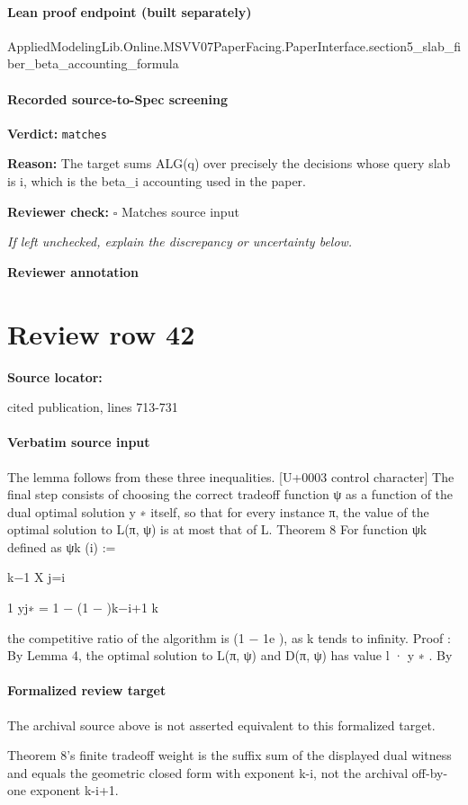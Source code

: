 \documentclass[10pt]{article}
\newcommand{\reviewerbox}{%
  \par\noindent\fbox{\parbox{0.96\linewidth}{\rule{0pt}{0.38in}}}\par
}
\newcommand{\reviewmatch}[1]{%
  \par\noindent\textbf{Reviewer check:} $\square$\; #1\par
  \noindent\emph{If left unchecked, explain the discrepancy or uncertainty below.}\par
}
\begin{document}
\paragraph{Lean proof endpoint (built separately)}\begin{ReviewVerbatim}
AppliedModelingLib.Online.MSVV07PaperFacing.PaperInterface.section5_slab_fiber_beta_accounting_formula
\end{ReviewVerbatim}

\paragraph{Recorded source-to-Spec screening}
\textbf{Verdict:} \texttt{matches}
\\
{\raggedright
\textbf{Reason:} The target sums ALG(q) over precisely the decisions whose query slab is i, which is the beta\_\allowbreak{}i accounting used in the paper.\allowbreak{}
\par}
\reviewmatch{Matches source input}
\noindent\textbf{Reviewer annotation}\par
\reviewerbox
\clearpage
\hypertarget{source-claim-7ece82b2d9fe4810}{}
\section*{Review row 42}
\textbf{Source locator:} {\footnotesize\raggedright cited publication, lines 713-\allowbreak{}731\par}
\paragraph{Verbatim source input}
\begin{ReviewVerbatim}
The lemma follows from these three inequalities.
[U+0003 control character]
The final step consists of choosing the correct tradeoff function ψ as a function of the dual
optimal solution y ∗ itself, so that for every instance π, the value of the optimal solution to
L(π, ψ) is at most that of L.
Theorem 8 For function ψk defined as
ψk (i) :=

k−1
X
j=i

1
yj∗ = 1 − (1 − )k−i+1
k

the competitive ratio of the algorithm is (1 − 1e ), as k tends to infinity.
Proof :
By Lemma 4, the optimal solution to L(π, ψ) and D(π, ψ) has value l · y ∗ . By
\end{ReviewVerbatim}


\paragraph{Formalized review target}
The archival source above is not asserted equivalent to this formalized target.
\begin{ReviewVerbatim}
Theorem 8's finite tradeoff weight is the suffix sum of the displayed dual witness and equals the geometric closed form with exponent k-i, not the archival off-by-one exponent k-i+1.
\end{ReviewVerbatim}
\end{document}
